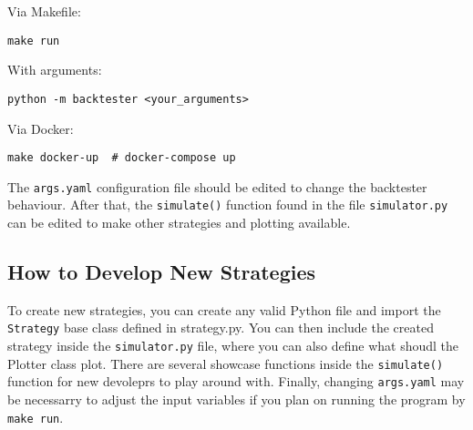 Via Makefile:
\begin{verbatim}
make run
\end{verbatim}

With arguments:
\begin{verbatim}
python -m backtester <your_arguments>
\end{verbatim}

Via Docker:
\begin{verbatim}
make docker-up  # docker-compose up
\end{verbatim}

The \texttt{args.yaml} configuration file should be edited to change the backtester behaviour. After that, the \texttt{simulate()} function found in the file \texttt{simulator.py} can be edited to make other strategies and plotting available.

\subsection*{How to Develop New Strategies}
To create new strategies, you can create any valid Python file and import the \texttt{Strategy} base class defined in strategy.py.
You can then include the created strategy inside the \texttt{simulator.py} file, where you can also define what shoudl the Plotter class plot.
There are several showcase functions inside the \texttt{simulate()} function for new devoleprs to play around with.
Finally, changing \texttt{args.yaml} may be necessarry to adjust the input variables if you plan on running the program by \texttt{make run}.
